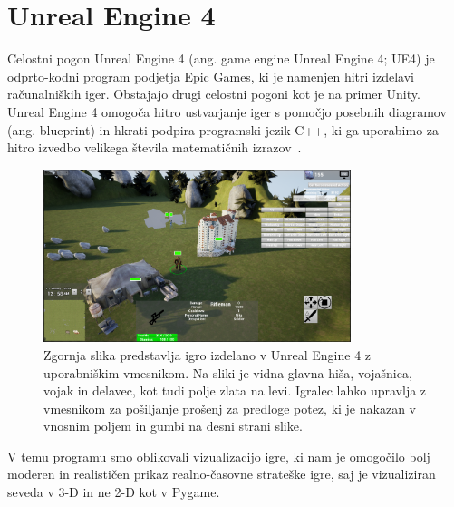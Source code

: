 \documentclass[a4paper, 12pt]{book}
\begin{document}
\section{Unreal Engine 4}
\label{UnrealEngine}

Celostni pogon Unreal Engine 4 (ang. game engine Unreal Engine 4; UE4) je odprto-kodni program podjetja Epic Games, ki je namenjen hitri izdelavi računalniških iger. 
Obstajajo drugi celostni pogoni kot je na primer Unity.\\
Unreal Engine 4 omogoča hitro ustvarjanje iger s pomočjo posebnih diagramov (ang. blueprint) in hkrati podpira programski jezik C++, ki ga uporabimo za hitro izvedbo velikega števila matematičnih izrazov~\cite{diploma2}.

\begin{figure}[h]
	\begin{center}
		\includegraphics[width=0.8\textwidth]{photos/ue4-widget.pdf}
	\end{center}
	\caption{Zgornja slika predstavlja igro izdelano v Unreal Engine 4 z uporabniškim vmesnikom. Na sliki je vidna glavna hiša, vojašnica, vojak in delavec, kot tudi polje zlata na levi. Igralec lahko upravlja z vmesnikom za pošiljanje prošenj za predloge potez, ki je nakazan v vnosnim poljem in gumbi na desni strani slike. }
	\label{ue4-game}
\end{figure}

V temu programu smo oblikovali vizualizacijo igre, ki nam je omogočilo bolj moderen in realističen prikaz realno-časovne strateške igre, saj je vizualiziran seveda v 3-D in ne 2-D kot v Pygame.
\end{document}
